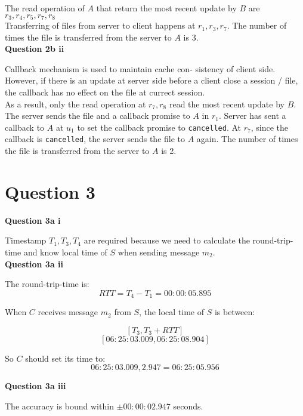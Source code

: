 \documentclass[11pt,a4paper]{report}
\begin{document}
\begin{multicols*}{2}
\noindent The read operation of $A$ that return the most recent update by $B$ are $r_3,r_4,r_5,r_7,r_8$\\

\noindent Transferring of files from server to client happens at $r_1,r_3,r_7$. The number of times the file is transferred from the server to $A$ is 3.\\

\noindent \textbf{Question 2b ii}

\noindent Callback mechanism is used to maintain cache con- sistency of client side. However, if there is an update at server side before a client close a session / file, the callback has no effect on the file at currect session. \\

\noindent As a result, only the read operation at $r_7,r_8$ read the most recent update by $B$. \\

\noindent The server sends the file and a callback promise to $A$ in $r_1$. Server has sent a callback to $A$ at $u_1$ to set the callback promise to \verb|cancelled|. At $r_7$, since the callback is \verb|cancelled|, the server sends the file to $A$ again. The number of times the file is transferred from the server to $A$ is 2. 

\section{Question 3}

\noindent \textbf{Question 3a i}

\noindent Timestamp $T_1,T_3,T_4$ are required because we need to calculate the round-trip-time and know local time of $S$ when sending message $m_2$.\\

\noindent \textbf{Question 3a ii}

\noindent The round-trip-time is:
$$RTT = T_4 - T_1 = 00:00:05.895$$

\noindent When $C$ receives message $m_2$ from $S$, the local time of $S$ is between:

$$[T_3, T_3+RTT]$$
$$[06:25:03.009, 06:25:08.904]$$

\noindent So $C$ should set its time to:
$$06:25:03.009, 2.947 = 06:25:05.956$$

\noindent \textbf{Question 3a iii}

\noindent The accuracy is bound within $\pm 00:00:02.947$ seconds.\\


\end{multicols*}
\end{document}
